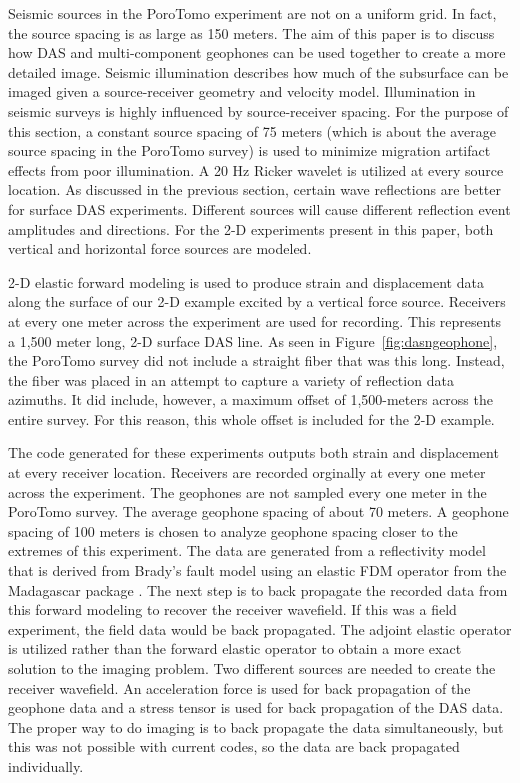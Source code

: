 Seismic sources in the PoroTomo experiment are not on a uniform grid. In fact, the source spacing is as large as 150 meters. The aim of this paper is to discuss how DAS and multi-component geophones can be used together to create a more detailed image. Seismic illumination describes how much of the subsurface can be imaged given a source-receiver geometry and velocity model. Illumination in seismic surveys is highly influenced by source-receiver spacing. For the purpose of this section, a constant source spacing of 75 meters (which is about the average source spacing in the PoroTomo survey) is used to minimize migration artifact effects from poor illumination. A 20 Hz Ricker wavelet is utilized at every source location. As discussed in the previous section, certain wave reflections are better for surface DAS experiments. Different sources will cause different reflection event amplitudes and directions. For the 2-D experiments present in this paper, both vertical and horizontal force sources are modeled.

2-D elastic forward modeling is used to produce strain and displacement data along the surface of our 2-D example excited by a vertical force source. Receivers at every one meter across the experiment are used for recording. This represents a 1,500 meter long, 2-D surface DAS line. As seen in Figure~\ref{fig:dasngeophone}, the PoroTomo survey did not include a straight fiber that was this long. Instead, the fiber was placed in an attempt to capture a variety of reflection data azimuths. It did include, however, a maximum offset of 1,500-meters across the entire survey. For this reason, this whole offset is included for the 2-D example.

The code generated for these experiments outputs both strain and displacement at every receiver location. Receivers are recorded orginally at every one meter across the experiment. The geophones are not sampled every one meter in the PoroTomo survey. The average geophone spacing of about 70 meters. A geophone spacing of 100 meters is chosen to analyze geophone spacing closer to the extremes of this experiment. The data are generated from a reflectivity model that is derived from Brady's fault model using an elastic FDM operator from the Madagascar package \citep{fomel2013madagascar}. The next step is to back propagate the recorded data from this forward modeling to recover the receiver wavefield. If this was a field experiment, the field data would be back propagated. The adjoint elastic operator is utilized rather than the forward elastic operator to obtain a more exact solution to the imaging problem. Two different sources are needed to create the receiver wavefield. An acceleration force is used for back propagation of the geophone data and a stress tensor is used for back propagation of the DAS data. The proper way to do imaging is to back propagate the data simultaneously, but this was not possible with current codes, so the data are back propagated individually.

